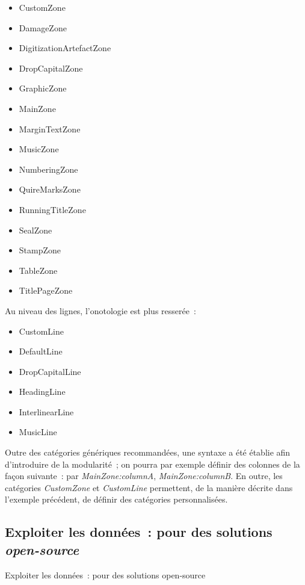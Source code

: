 \documentclass[a4paper,12pt,twoside]{book}
\begin{document}
				\begin{itemize}
					\item
					CustomZone
					\item
					DamageZone
					\item
					DigitizationArtefactZone
					\item
					DropCapitalZone
					\item
					GraphicZone
					\item
					MainZone
					\item
					MarginTextZone
					\item
					MusicZone
					\item
					NumberingZone
					\item
					QuireMarksZone
					\item
					RunningTitleZone
					\item
					SealZone
					\item
					StampZone
					\item
					TableZone
					\item
					TitlePageZone
				\end{itemize}
				
				Au niveau des lignes, l'onotologie est plus resserée~:
				
				\begin{itemize}
					\item
					CustomLine
					\item
					DefaultLine
					\item
					DropCapitalLine
					\item
					HeadingLine
					\item
					InterlinearLine
					\item
					MusicLine
				\end{itemize}
				
				Outre des catégories génériques recommandées, une syntaxe a été établie
				afin d'introduire de la modularité~; on pourra par exemple définir des
				colonnes de la façon suivante~: par \textit{MainZone:columnA},
				\textit{MainZone:columnB}. En outre, les catégories \textit{CustomZone} et
				\textit{CustomLine} permettent, de la manière décrite dans l'exemple
				précédent, de définir des catégories personnalisées.
			
			\subsection{Exploiter les données~: pour des solutions
				\textit{open-source}}{Exploiter les données~: pour des solutions open-source}
			
\end{document}
